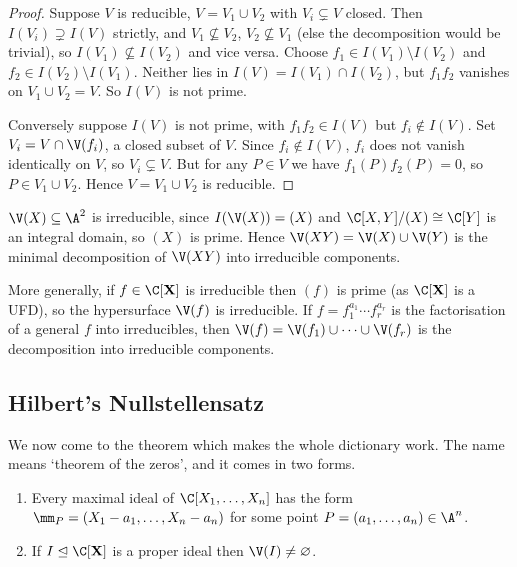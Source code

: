 \begin{proof}
	Suppose $V$ is reducible, $V = V_1 \cup V_2$ with $V_i \subsetneq V$ closed. Then $I(V_i) \supsetneq I(V)$ strictly, and $V_1 \not\subseteq V_2$, $V_2 \not\subseteq V_1$ (else the decomposition would be trivial), so $I(V_1) \not\subseteq I(V_2)$ and vice versa. Choose $f_1 \in I(V_1)\setminus I(V_2)$ and $f_2 \in I(V_2)\setminus I(V_1)$. Neither lies in $I(V) = I(V_1) \cap I(V_2)$, but $f_1f_2$ vanishes on $V_1 \cup V_2 = V$. So $I(V)$ is not prime.

	Conversely suppose $I(V)$ is not prime, with $f_1f_2 \in I(V)$ but $f_i \notin I(V)$. Set $V_i = V \cap \V(f_i)$, a closed subset of $V$. Since $f_i \notin I(V)$, $f_i$ does not vanish identically on $V$, so $V_i \subsetneq V$. But for any $P \in V$ we have $f_1(P)f_2(P) = 0$, so $P \in V_1 \cup V_2$. Hence $V = V_1 \cup V_2$ is reducible.
\end{proof}

\begin{example}
	$\V(X) \subseteq \A^2$ is irreducible, since $I(\V(X)) = (X)$ and $\C[X,Y]/(X) \cong \C[Y]$ is an integral domain, so $(X)$ is prime. Hence $\V(XY) = \V(X) \cup \V(Y)$ is the minimal decomposition of $\V(XY)$ into irreducible components.
\end{example}

\begin{example}
	More generally, if $f \in \C[\mathbf{X}]$ is irreducible then $(f)$ is prime (as $\C[\mathbf{X}]$ is a UFD), so the hypersurface $\V(f)$ is irreducible. If $f = f_1^{a_1}\cdots f_r^{a_r}$ is the factorisation of a general $f$ into irreducibles, then $\V(f) = \V(f_1) \cup \cdots \cup \V(f_r)$ is the decomposition into irreducible components.
\end{example}

\subsection{Hilbert's Nullstellensatz}

We now come to the theorem which makes the whole dictionary work. The name means `theorem of the zeros', and it comes in two forms.

\begin{theorem}\label{thm:weaknss}
	\begin{enumerate}[label=(\roman*)]
		\item Every maximal ideal of $\C[X_1,\dots,X_n]$ has the form $\mm_P = (X_1-a_1,\dots,X_n-a_n)$ for some point $P = (a_1,\dots,a_n) \in \A^n$.
		\item If $I \trianglelefteq \C[\mathbf{X}]$ is a proper ideal then $\V(I) \neq \varnothing$.
	\end{enumerate}
\end{theorem}

